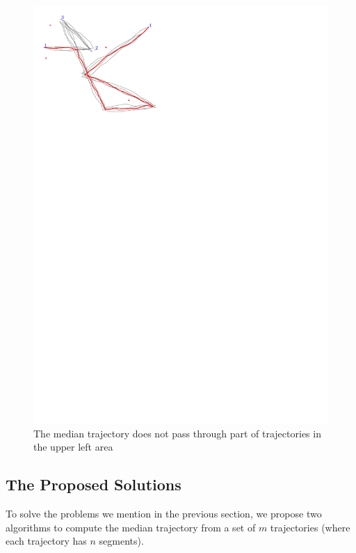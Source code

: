 \begin{figure}
\centering
\includegraphics[scale=1]{Gambar/homotopy_fail1}
\caption{The median trajectory does not pass through part of trajectories in the upper left area}
\label{fig:homotopy_fail1}
\end{figure}

\subsection{The Proposed Solutions}
\label{sec:solution}

To solve the problems we mention in the previous section, we propose two algorithms to compute the median trajectory from a set of $m$ trajectories (where each trajectory has $n$ segments).

